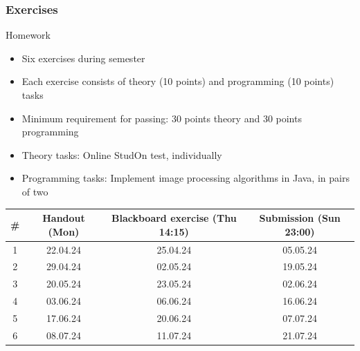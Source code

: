 \begin{frame}
	\frametitle{Exercises}
	\begin{block}{Homework}
		\begin{itemize}
			\item Six exercises during semester
			\item Each exercise consists of theory (10 points) and programming (10 points) tasks
			\item Minimum requirement for passing: 30 points theory and 30 points programming
			\item Theory tasks: Online StudOn test, individually
			\item Programming tasks: Implement image processing algorithms in Java, in pairs of two
		\end{itemize}
		\begin{center}
			\begin{tabular}{c | c | c | c}
				\# & Handout (Mon) 	& Blackboard exercise (Thu 14:15)	& Submission (Sun 23:00) \\ \hline
				1  & 22.04.24    	& 25.04.24               				& 05.05.24       \\
				2  & 29.04.24    	& 02.05.24                				& 19.05.24       \\
				3  & 20.05.24    	& 23.05.24                				& 02.06.24       \\
				4  & 03.06.24    	& 06.06.24                				& 16.06.24       \\
				5  & 17.06.24    	& 20.06.24                				& 07.07.24       \\
				6  & 08.07.24    	& 11.07.24                				& 21.07.24       \\
			\end{tabular}
		\end{center}
	\end{block}
\end{frame}

